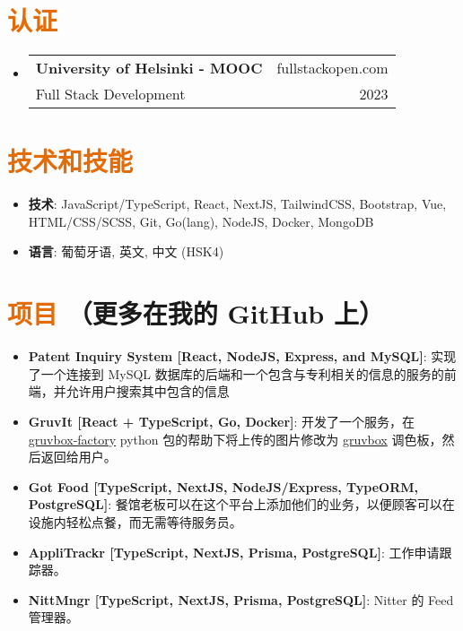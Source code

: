 \documentclass[a4paper, 20pt]{article}
\makeatletter
\newcommand{\resumeItem}[2]{
  \item\small{
    \textbf{#1}{: #2 \vspace{-2pt}}
  }
}
\newcommand{\resumeSubheading}[4]{
  \vspace{-1pt}\item
    \begin{tabular*}{0.97\textwidth}{l@{\extracolsep{\fill}}r}
      \textbf{#1} & #2 \\
      #3 & #4 \\
    \end{tabular*}\vspace{-5pt}
}
\newcommand{\resumeSubItem}[2]{\resumeItem{#1}{#2}\vspace{-3pt}}
\newcommand{\resumeSubHeadingListStart}{\begin{itemize}[leftmargin=*]}
\newcommand{\resumeSubHeadingListEnd}{\end{itemize}}
\makeatother
\begin{document}
\begin{CJK*}{UTF8}{gbsn}
\vspace{5pt}
\section{\textcolor[HTML]{E36C09}{\textbf{认证}}}
\resumeSubHeadingListStart{}
\resumeSubheading{University of Helsinki - MOOC}{fullstackopen.com}
{Full Stack Development}{2023}
\resumeSubHeadingListEnd{}

\vspace{5pt}
\section{\textcolor[HTML]{E36C09}{\textbf{技术和技能}}}
	\resumeSubHeadingListStart{}
	  \resumeSubItem{技术}{\quad JavaScript/TypeScript, React, NextJS, TailwindCSS, Bootstrap, Vue, HTML/CSS/SCSS, Git, Go(lang), NodeJS, Docker, MongoDB}
	  \resumeSubItem{语言}{\quad 葡萄牙语, 英文, 中文 (HSK4)}
  \resumeSubHeadingListEnd{}


\vspace{5pt}
\section{\textcolor[HTML]{E36C09}{\textbf{项目}} \tiny{（更多在我的 GitHub 上）}}
  \resumeSubHeadingListStart{}
    \resumeSubItem{Patent Inquiry System [React, NodeJS, Express, and MySQL]}
      {实现了一个连接到 MySQL 数据库的后端和一个包含与专利相关的信息的服务的前端，并允许用户搜索其中包含的信息}
      \vspace{2pt}
      \resumeSubItem{GruvIt [React + TypeScript, Go, Docker]}
      {开发了一个服务，在 \href{https://github.com/paulopacitti/gruvbox-factory}{gruvbox-factory} python 包的帮助下将上传的图片修改为 \href{https://github.com/morhetz/gruvbox}{gruvbox} 调色板，然后返回给用户。}
      \vspace{2pt}
      \resumeSubItem{Got Food [TypeScript, NextJS, NodeJS/Express, TypeORM, PostgreSQL]}
      {餐馆老板可以在这个平台上添加他们的业务，以便顾客可以在设施内轻松点餐，而无需等待服务员。}
      \vspace{2pt}
      \resumeSubItem{AppliTrackr [TypeScript, NextJS, Prisma, PostgreSQL]}
      {工作申请跟踪器。}
      \vspace{2pt}
      \resumeSubItem{NittMngr [TypeScript, NextJS, Prisma, PostgreSQL]}
      {Nitter 的 Feed 管理器。}
      \vspace{2pt}
  \resumeSubHeadingListEnd{}

\clearpage\end{CJK*}
\end{document}
